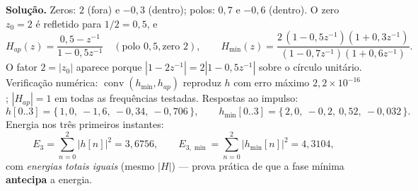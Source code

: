 

\textbf{Solução.} Zeros: $2$ (fora) e $-0{,}3$ (dentro); polos: $0{,}7$ e
$-0{,}6$ (dentro). O zero $z_0=2$ é refletido para $1/2=0{,}5$, e
\[
  H_{ap}(z)=\frac{0{,}5-z^{-1}}{1-0{,}5z^{-1}}\quad(\text{polo }0{,}5,
  \text{zero }2),\qquad
  H_{\min}(z)=\frac{2\,(1-0{,}5z^{-1})(1+0{,}3z^{-1})}
  {(1-0{,}7z^{-1})(1+0{,}6z^{-1})}.
\]
O fator $2=|z_0|$ aparece porque $|1-2z^{-1}|=2|1-0{,}5z^{-1}|$ sobre o
círculo unitário. Verificação numérica: $\operatorname{conv}(h_{\min},
h_{ap})$ reproduz $h$ com erro máximo $2{,}2\times10^{-16}$; $|H_{ap}|=1$ em
todas as frequências testadas. Respostas ao impulso:
\[
  h[0..3]=\{\,1{,}0,\ -1{,}6,\ -0{,}34,\ -0{,}706\,\},\qquad
  h_{\min}[0..3]=\{\,2{,}0,\ -0{,}2,\ 0{,}52,\ -0{,}032\,\}.
\]
Energia nos três primeiros instantes:
\[
  E_3=\sum_{n=0}^{2}|h[n]|^{2}=3{,}6756,\qquad
  E_{3,\min}=\sum_{n=0}^{2}|h_{\min}[n]|^{2}=4{,}3104 ,
\]
com \emph{energias totais iguais} (mesmo $|H|$) — prova prática de que a fase
mínima \textbf{antecipa} a energia.

